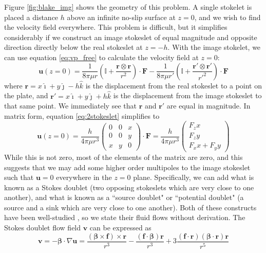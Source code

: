 \documentclass[11pt]{ucthesis}
\begin{document}
Figure \ref{fig:blake_img} shows the geometry of this problem. A single stokelet is placed a distance $h$ above an infinite no-slip surface at $z=0$, and we wish to find the velocity field everywhere. This problem is difficult, but it simplifies considerably if we construct an image stokeslet of equal magnitude and opposite direction directly below the real stokeslet at $z=-h$. With the image stokelet, we can use equation \ref{eq:vp_free} to calculate the velocity field at $z=0$:
\begin{equation}
\label{eq:2stokeslet}
\mathbf{u}(z = 0) = \frac{1}{8\pi \mu r }\left(\mathbb{I} + \frac{\mathbf{r\otimes r}}{r^2}\right)\cdot\mathbf{F} - \frac{1}{8\pi \mu r' }\left(\mathbb{I} + \frac{\mathbf{r'\otimes r'}}{r'^2}\right)\cdot\mathbf{F}
\end{equation} 
where $\mathbf{r} = x\hat\imath + y\hat\jmath - h\hat k$ is the displacement from the real stokeslet to a point on the plate, and $\mathbf{r'}= x\hat\imath + y\hat\jmath + h\hat k$ is the displacement from the image stokeslet to that same point. We immediately see that $\mathbf{r}$ and $\mathbf{r'}$ are equal in magnitude. In matrix form, equation \ref{eq:2stokeslet} simplifies to
\begin{equation}
\label{eq:stokeslets_mtx}
\mathbf{u}(z = 0) = \frac{h}{4\pi\mu r^3}\left(\begin{array}{ccc}
0&0&x\\
0&0&y\\
x&y&0
\end{array}\right)\cdot\mathbf{F} = \frac{h}{4\pi\mu r^3}\left(\begin{array}{c}
F_z x\\
F_z y\\
F_x x + F_y y
\end{array}\right)
\end{equation}
While this is not zero, most of the elements of the matrix are zero, and this suggests that we may add some higher order multipoles to the image stokeslet such that $\mathbf{u} = 0$ everywhere in the $z=0$ plane. Specifically, we can add what is known as a Stokes doublet (two opposing stokeslets which are very close to one another), and what is known as a ``source doublet" or ``potential doublet" (a source and a sink which are very close to one another). Both of these constructs have been well-studied \cite{chwang1975hydromechanics}, so we state their fluid flows without derivation. The Stokes doublet flow field $\mathbf{v}$ can be expressed as
\begin{equation}
\label{eq:stokes_doublet}
\mathbf{v} = -\boldsymbol{\beta}\cdot\nabla\mathbf{u} = \frac{(\boldsymbol{\beta}\times\mathbf{f})\times\mathbf{r}}{r^3} - \frac{(\mathbf{f}\cdot \boldsymbol{\beta})\mathbf{r}}{r^3} + 3\frac{(\mathbf{f}\cdot\mathbf{r})(\boldsymbol{\beta}\cdot\mathbf{r})\mathbf{r}}{r^5} 
\end{equation}
\end{document}
